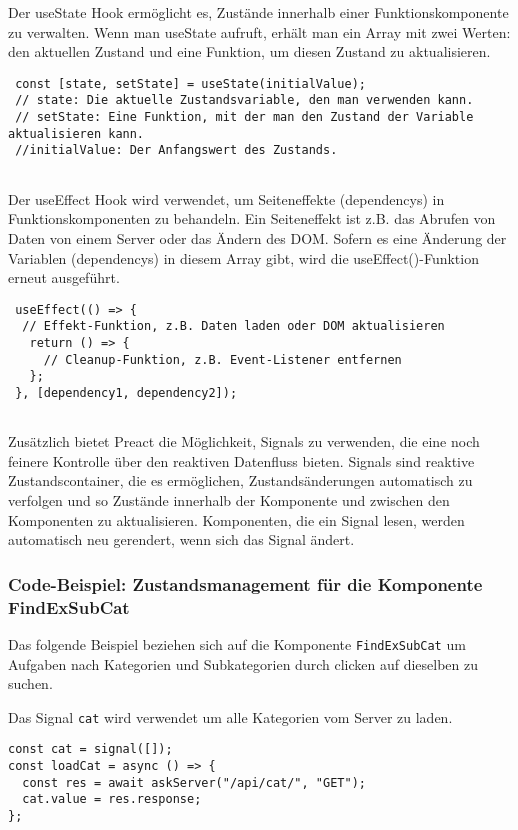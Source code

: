  Der useState Hook ermöglicht es, Zustände innerhalb einer Funktionskomponente zu verwalten. Wenn man useState aufruft, erhält man ein Array mit zwei Werten: den aktuellen Zustand und eine Funktion, um diesen Zustand zu aktualisieren.
 
 \begin{lstlisting}
 const [state, setState] = useState(initialValue);
 // state: Die aktuelle Zustandsvariable, den man verwenden kann.
 // setState: Eine Funktion, mit der man den Zustand der Variable aktualisieren kann.
 //initialValue: Der Anfangswert des Zustands.
 
 \end{lstlisting}
 
 
 Der useEffect Hook wird verwendet, um Seiteneffekte (dependencys) in Funktionskomponenten zu behandeln. Ein Seiteneffekt ist z.B. das Abrufen von Daten von einem Server oder das Ändern des DOM. Sofern es eine Änderung der Variablen (dependencys) in diesem Array gibt, wird die useEffect()-Funktion erneut ausgeführt.
 
 \begin{lstlisting}
 useEffect(() => {
  // Effekt-Funktion, z.B. Daten laden oder DOM aktualisieren
   return () => {
     // Cleanup-Funktion, z.B. Event-Listener entfernen
   };
 }, [dependency1, dependency2]);
 
 \end{lstlisting}
   
 
 
Zusätzlich bietet Preact die Möglichkeit, Signals zu verwenden, die eine noch feinere Kontrolle über den reaktiven Datenfluss bieten.
Signals sind reaktive Zustandscontainer, die es ermöglichen, Zustandsänderungen automatisch zu verfolgen und so Zustände innerhalb der Komponente und zwischen den Komponenten zu aktualisieren. Komponenten, die ein Signal lesen, werden automatisch neu gerendert, wenn sich das Signal ändert.
 

\subsubsection{Code-Beispiel: Zustandsmanagement für die Komponente FindExSubCat } 
Das folgende Beispiel beziehen sich auf die Komponente \texttt{FindExSubCat} um Aufgaben nach Kategorien und Subkategorien durch clicken auf dieselben zu suchen.

Das Signal \texttt{cat} wird verwendet um alle Kategorien vom Server zu laden.

\begin{lstlisting}
const cat = signal([]);
const loadCat = async () => {
  const res = await askServer("/api/cat/", "GET");
  cat.value = res.response;
};

\end{lstlisting}

